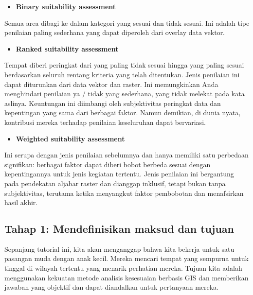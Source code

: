 \documentclass[]{book}
\providecommand{\tightlist}{%
  \setlength{\itemsep}{0pt}\setlength{\parskip}{0pt}}
\begin{document}
\begin{itemize}
\tightlist
\item
  \textbf{Binary suitability assessment}
\end{itemize}

Semua area dibagi ke dalam kategori yang sesuai dan tidak sesuai. Ini adalah tipe penilaian paling sederhana yang dapat diperoleh dari overlay data vektor.

\begin{itemize}
\tightlist
\item
  \textbf{Ranked suitability assessment}
\end{itemize}

Tempat diberi peringkat dari yang paling tidak sesuai hingga yang paling sesuai berdasarkan seluruh rentang kriteria yang telah ditentukan. Jenis penilaian ini dapat diturunkan dari data vektor dan raster. Ini memungkinkan Anda menghindari penilaian ya / tidak yang sederhana, yang tidak melekat pada kata aslinya. Keuntungan ini diimbangi oleh subjektivitas peringkat data dan kepentingan yang sama dari berbagai faktor. Namun demikian, di dunia nyata, kontribusi mereka terhadap penilaian keseluruhan dapat bervariasi.

\begin{itemize}
\tightlist
\item
  \textbf{Weighted suitability assessment}
\end{itemize}

Ini serupa dengan jenis penilaian sebelumnya dan hanya memiliki satu perbedaan signifikan: berbagai faktor dapat diberi bobot berbeda sesuai dengan kepentingannya untuk jenis kegiatan tertentu. Jenis penilaian ini bergantung pada pendekatan aljabar raster dan dianggap inklusif, tetapi bukan tanpa subjektivitas, terutama ketika menyangkut faktor pembobotan dan menafsirkan hasil akhir.

\hypertarget{tahap-1-mendefinisikan-maksud-dan-tujuan}{%
\subsection{Tahap 1: Mendefinisikan maksud dan tujuan}\label{tahap-1-mendefinisikan-maksud-dan-tujuan}}

Sepanjang tutorial ini, kita akan menganggap bahwa kita bekerja untuk satu pasangan muda dengan anak kecil. Mereka mencari tempat yang sempurna untuk tinggal di wilayah tertentu yang menarik perhatian mereka. Tujuan kita adalah menggunakan kekuatan metode analisis kesesuaian berbasis GIS dan memberikan jawaban yang objektif dan dapat diandalkan untuk pertanyaan mereka.
\end{document}
